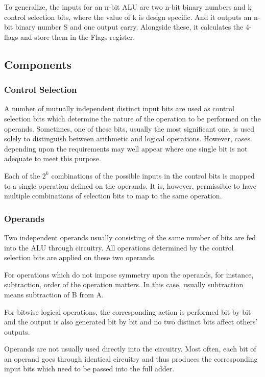 \documentclass{article}
\begin{document}
To generalize, the inputs for an  n-bit ALU are two n-bit binary numbers and k control selection bits, where the value of k is design specific. And it outputs an n-bit binary number S and one output carry. Alongside these, it calculates the 4-flags and store them in the Flags register.

\subsection{Components}

\subsubsection{Control Selection}

A number of mutually independent distinct input bits are used as control selection bits which determine the nature of the operation to be performed on the operands. Sometimes, one of these bits, usually the most significant one, is used solely to distinguish between arithmetic and logical operations. However, cases depending upon the requirements may well appear where one single bit is not adequate to meet this purpose. 


Each of the $2^{k}$ combinations of the possible inputs in the control bits is mapped to a single operation defined on the operands. It is, however, permissible to have multiple combinations of selection bits to map to the same operation. 

\subsubsection{Operands}

Two independent operands usually consisting of the same number of bits are fed into the ALU through circuitry. All operations determined by the control selection bits are applied on these two operands. 

For operations which do not impose symmetry upon the operands, for instance, subtraction, order of the operation matters. In this case, usually subtraction means subtraction of B from A. 

For bitwise logical operations, the corresponding action is performed bit by bit and the output is also generated bit by bit and no two distinct bits affect others’ outputs.

Operands are not usually used directly into the circuitry. Most often, each bit of an operand goes through identical circuitry and thus produces the corresponding input bits which need to be passed into the full adder.
\end{document}
